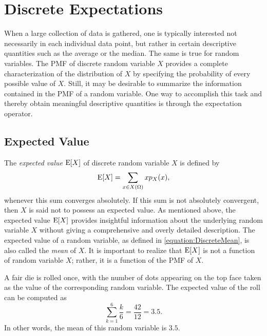 \chapter{Discrete Expectations}
\label{chapter:ExpectationsDiscrete}

When a large collection of data is gathered, one is typically interested not necessarily in each individual data point, but rather in certain descriptive quantities such as the average or the median.
The same is true for random variables.
The PMF of discrete random variable $X$ provides a complete characterization of the distribution of $X$ by specifying the probability of every possible value of $X$.
Still, it may be desirable to summarize the information contained in the PMF of a random variable.
One way to accomplish this task and thereby obtain meaningful descriptive quantities is through the expectation operator.


\section{Expected Value}

The \emph{expected value} $\mathrm{E} [X]$ of discrete random variable $X$ is defined by 
\begin{equation} \label{equation:DiscreteMean}
\mathrm{E} [X] = \sum_{x \in X(\Omega)} x p_X (x) ,
\end{equation}
whenever this sum converges absolutely.
If this sum is not absolutely convergent, then $X$ is said not to possess an expected value.
As mentioned above, the expected value $\mathrm{E} [X]$ provides insightful information about the underlying random variable $X$ without giving a comprehensive and overly detailed description.
The expected value of a random variable, as defined in \eqref{equation:DiscreteMean}, is also called the \emph{mean} of $X$. 
It is important to realize that $\mathrm{E} [X]$ is not a function of random variable $X$; rather, it is a function of the PMF of $X$.

\begin{example}
A fair die is rolled once, with the number of dots appearing on the top face taken as the value of the corresponding random variable.
The expected value of the roll can be computed as
\begin{equation*}
\sum_{k=1}^6 \frac{k}{6} = \frac{42}{12} = 3.5 .
\end{equation*}
In other words, the mean of this random variable is $3.5$.
\end{example}


